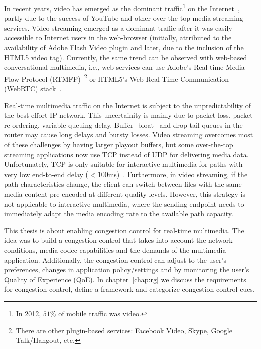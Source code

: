 In recent years, video has emerged as the dominant traffic\footnote{In 2012,
$51\%$ of mobile traffic was video.} on the Internet~\cite{cvni.13,dawn.zb},
partly due to the success of YouTube and other over-the-top media streaming
services. Video streaming emerged as a dominant traffic after it was easily
accessible to Internet users in the web-browser (initially, attributed to the
availability of Adobe Flash Video plugin and later, due to the inclusion of
the HTML5 video tag). Currently, the same trend can be observed with web-based
conversational multimedia, i.e., web services can use Adobe's Real-time Media
Flow Protocol (RTMFP)~\cite{draft.rtmfp}\footnote{There are other plugin-based
services: Facebook Video, Skype, Google Talk/Hangout, etc.} or HTML5's Web
Real-Time Communication (WebRTC) stack~\cite{draft.webrtc}.

Real-time multimedia traffic on the Internet is subject to the
unpredictability of the best-effort IP network. This uncertainity is mainly
due to packet loss, packet re-ordering, variable queuing delay. Buffer-
bloat~\cite{gettys:bufferbloat} and drop-tail queues in the router may cause
long delays and bursty losses. Video streaming overcomes most of these
challenges by having larger playout buffers, but some over-the-top streaming
applications now use TCP instead of UDP for delivering media data.
Unfortunately, TCP is only suitable for interactive multimedia for paths with
very low end-to-end delay ($<100$ms)~\cite{Brosh:tcp-real-time}. Furthermore,
in video streaming, if the path characteristics change, the client can switch
between files with the same media content pre-encoded at different quality
levels. However, this strategy is not applicable to interactive multimedia,
where the sending endpoint needs to immediately adapt the media encoding rate
to the available path capacity.


This thesis is about enabling congestion control for real-time multimedia. The
idea was to build a congestion control that takes into account the network
conditions, media codec capabilities and the demands of the multimedia
application. Additionally, the congestion control can adjust to the user's
preferences, changes in application policy/settings and by monitoring the
user's Quality of Experience (QoE). In chapter~\ref{chap:rg} we discuss the
requirements for congestion control, define a framework and categorize
congestion control cues.


